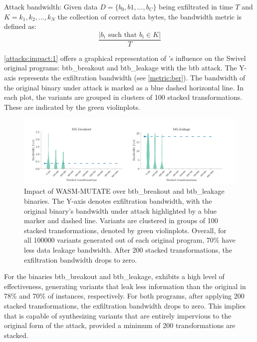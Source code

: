 \begin{definition}{Attack bandwidth:}\label{metric:ber}
    Given data $D=\{b_0, b1, ..., b_C\}$ being exfiltrated in time $T$ and $K = {k_1, k_2, ..., k_N}$ the collection of correct data bytes, the bandwidth metric is defined as:
    $$
        \frac{|b_i\text{ such that } b_i \in K|}{T}
    $$
\end{definition}




\autoref{attacks:impact:1} offers a graphical representation of \tool's influence on the Swivel original programs: btb\_breakout and btb\_leakage with the btb attack. 
The Y-axis represents the exfiltration bandwidth (see \autoref{metric:ber}). 
The bandwidth of the original binary under attack is marked as a blue dashed horizontal line.
In each plot, the variants are grouped in clusters of 100 stacked transformations. 
These are indicated by the green violinplots.

\begin{figure}[h]
    \centering
    \includegraphics[width=\linewidth]{plots/spectre/results.rq3.1.pdf}
    \caption{Impact of WASM-MUTATE over btb\_breakout and btb\_leakage binaries. The Y-axis denotes exfiltration bandwidth, with the original binary's bandwidth under attack highlighted by a blue marker and dashed line. Variants are clustered in groups of 100 stacked transformations, denoted by green violinplots. 
    Overall, for all 100000 variants generated out of each original program, 70\% have less data leakage bandwidth.
    After 200 stacked transformations, the exfiltration bandwidth drops to zero.
    }
  \label{attacks:impact:1}
\end{figure}

 For the binaries btb\_breakout and btb\_leakage, \tool exhibits a high level of effectiveness, generating variants that leak less information than the original in 78\% and 70\% of instances, respectively.
For both programs, after applying 200 stacked transformations, the exfiltration bandwidth drops to zero.
This implies that \tool is capable of synthesizing variants that are entirely impervious to the original form of the attack, provided a minimum of 200 transformations are stacked.


